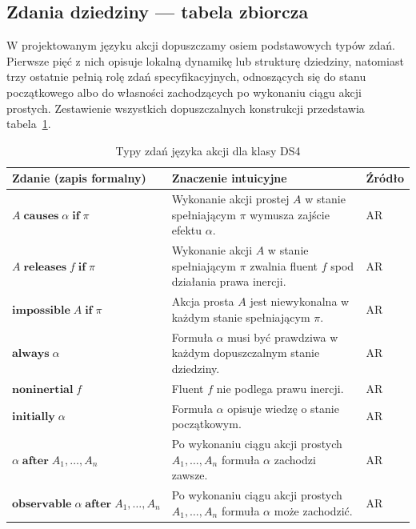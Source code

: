 \documentclass[11pt,a4paper]{article}
\theoremstyle{definition}
\begin{document}
\subsection{Zdania dziedziny --- tabela zbiorcza}

W projektowanym języku akcji dopuszczamy osiem podstawowych typów zdań. Pierwsze pięć z nich opisuje lokalną dynamikę lub strukturę dziedziny, natomiast trzy ostatnie pełnią rolę zdań specyfikacyjnych, odnoszących się do stanu początkowego albo do własności zachodzących po wykonaniu ciągu akcji prostych. Zestawienie wszystkich dopuszczalnych konstrukcji przedstawia tabela~\ref{tab:ds4-action-language}.

\begin{table}[ht]
\centering
\caption{Typy zdań języka akcji dla klasy DS4}
\label{tab:ds4-action-language}
\renewcommand{\arraystretch}{1.2}
\begin{tabular}{|p{}|p{}|p{}|}
\hline
\textbf{Zdanie (zapis formalny)} & \textbf{Znaczenie intuicyjne} & \textbf{Źródło} \\ \hline

$A \;\textbf{causes}\; \alpha \;\textbf{if}\; \pi$ &
Wykonanie akcji prostej $A$ w stanie spełniającym $\pi$ wymusza zajście efektu $\alpha$. &
AR \\ \hline

$A \;\textbf{releases}\; f \;\textbf{if}\; \pi$ &
Wykonanie akcji $A$ w stanie spełniającym $\pi$ zwalnia fluent $f$ spod działania prawa inercji. &
AR \\ \hline

$\textbf{impossible}\; A \;\textbf{if}\; \pi$ &
Akcja prosta $A$ jest niewykonalna w każdym stanie spełniającym $\pi$. &
AR \\ \hline

$\textbf{always}\; \alpha$ &
Formuła $\alpha$ musi być prawdziwa w każdym dopuszczalnym stanie dziedziny. &
AR \\ \hline

$\textbf{noninertial}\; f$ &
Fluent $f$ nie podlega prawu inercji. &
AR \\ \hline

$\textbf{initially}\; \alpha$ &
Formuła $\alpha$ opisuje wiedzę o stanie początkowym. &
AR \\ \hline

$\alpha \;\textbf{after}\; A_1,\dots,A_n$ &
Po wykonaniu ciągu akcji prostych $A_1,\dots,A_n$ formuła $\alpha$ zachodzi zawsze. &
AR \\ \hline

$\textbf{observable}\; \alpha \;\textbf{after}\; A_1,\dots,A_n$ &
Po wykonaniu ciągu akcji prostych $A_1,\dots,A_n$ formuła $\alpha$ może zachodzić. &
AR \\ \hline

\end{tabular}
\end{table}
\end{document}
